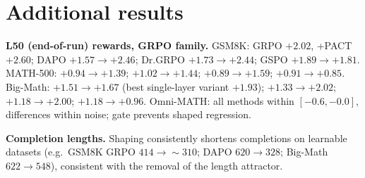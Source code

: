 \documentclass{article} %
\theoremstyle{plain}
\theoremstyle{definition}
\theoremstyle{remark}
\newcommand{\method}{PACT}
\begin{document}
\section{Additional results}
\label{app:more}

\textbf{L50 (end-of-run) rewards, GRPO family.} GSM8K: GRPO $+2.02$, +\method{} $+2.60$; DAPO $+1.57\to+2.46$; Dr.GRPO $+1.73\to+2.44$; GSPO $+1.89\to+1.81$. MATH-500: $+0.94\to+1.39$; $+1.02\to+1.44$; $+0.89\to+1.59$; $+0.91\to+0.85$. Big-Math: $+1.51\to+1.67$ (best single-layer variant $+1.93$); $+1.33\to+2.02$; $+1.18\to+2.00$; $+1.18\to+0.96$. Omni-MATH: all methods within $[-0.6, -0.0]$, differences within noise; gate prevents shaped regression.

\textbf{Completion lengths.} Shaping consistently shortens completions on learnable datasets (e.g.\ GSM8K GRPO $414\to\sim310$; DAPO $620\to328$; Big-Math $622\to548$), consistent with the removal of the length attractor.
\end{document}
